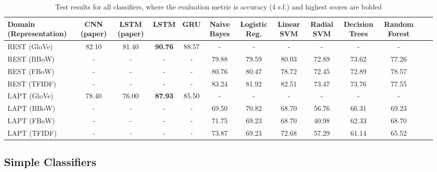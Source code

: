 \documentclass[comsoc,conference]{IEEEtran}
\begin{document}
\begin{table}
\begin{tabularx}{\textwidth}{@{}l*{11}{C}c@{}}
\toprule
Domain (Representation) & CNN (paper) & LSTM (paper) & LSTM & GRU & Naive Bayes & Logistic Reg. & Linear SVM & Radial SVM & Decision Trees & Random Forest \\ 
\midrule
REST (GloVe)    & 82.10 & 81.40 & \textbf{90.76} & 88.57 & -     & -     & -     & -     & -     & -     \\
REST (BBoW)     & -     & -     & -              & -     & 79.88 & 79.59 & 80.03 & 72.89 & 73.62 & 77.26 \\
REST (FBoW)     & -     & -     & -              & -     & 80.76 & 80.47 & 78.72 & 72.45 & 72.89 & 78.57 \\
REST (TFIDF)    & -     & -     & -              & -     & 83.24 & 81.92 & 82.51 & 73.47 & 73.76 & 77.55 \\
LAPT (GloVe)        & 78.40 & 76.00 & \textbf{87.93} & 85.50 & -     & -     & -     & -     & -     & -     \\
LAPT (BBoW)         & -     & -     & -              & -     & 69.50 & 70.82 & 68.70 & 56.76 & 66.31 & 69.23 \\
LAPT (FBoW)         & -     & -     & -              & -     & 71.75 & 69.23 & 68.70 & 40.98 & 62.33 & 68.70 \\
LAPT (TFIDF)        & -     & -     & -              & -     & 73.87 & 69.23 & 72.68 & 57.29 & 61.14 & 65.52 \\
\bottomrule
\end{tabularx}
\caption{Test results for all classifiers, where the evaluation metric is accuracy (4 s.f.) and highest scores are bolded}
\label{R1}
\end{table}


\subsection{Simple Classifiers}
\end{document}
